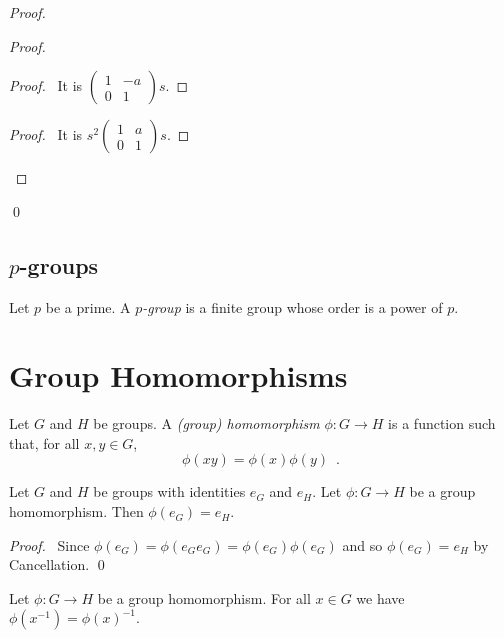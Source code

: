 \begin{proof}
\begin{proof}
\begin{proof}
\pf\ It is $\left( \begin{array}{cc}
1 & -a \\ 0 & 1 \end{array} \right) s$.
\end{proof}
\begin{proof}
\pf\ It is $s^2 \left( \begin{array}{cc}
1 & a \\ 0 & 1 \end{array} \right) s$.
\end{proof}
\end{proof}
\qed
\end{proof}

\section{$p$-groups}

\begin{df}[$p$-group]
Let $p$ be a prime. A \emph{$p$-group} is a finite group whose order is a power of $p$.
\end{df}

\chapter{Group Homomorphisms}

\begin{df}[Homomorphism]
    Let $G$ and $H$ be groups. A \emph{(group) homomorphism} $\phi : G \rightarrow H$ is a function such that, for all $x,y \in G$,
    \[ \phi(xy) = \phi(x) \phi(y) \enspace . \]
\end{df}

\begin{prop}
    Let $G$ and $H$ be groups with identities $e_G$ and $e_H$.
    Let $\phi : G \rightarrow H$ be a group homomorphism. Then $\phi(e_G) = e_H$.
\end{prop}

\begin{proof}
    \pf\ Since $\phi(e_G) = \phi(e_G e_G) = \phi(e_G) \phi(e_G)$ and so $\phi(e_G) = e_H$ by Cancellation. \qed
\end{proof}

\begin{prop}
    Let $\phi : G \rightarrow H$ be a group homomorphism. For all $x \in G$ we have $\phi(x^{-1}) = \phi(x)^{-1}$.
\end{prop}

